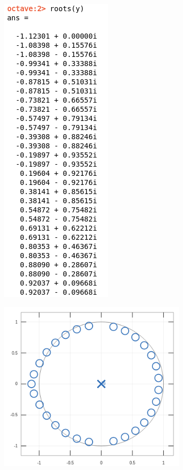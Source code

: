 \documentclass[11pt,a4paper]{article}
\begin{document}
\begin{figure}[H]
\begin{subfigure}{.5\textwidth}
  \centering
  \includegraphics[width=.3\linewidth]{img/polos1.png}
\end{subfigure}%
\begin{subfigure}{.5\textwidth}
  \centering
  \includegraphics[width=1\linewidth]{img/polosg1.png}
\end{subfigure}
\end{figure}
	
\end{document}
